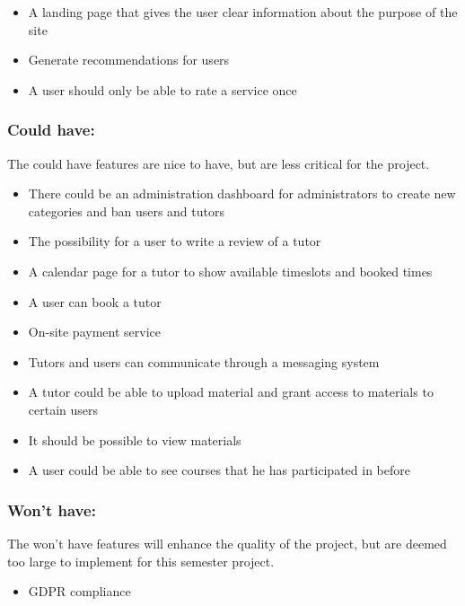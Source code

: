 \begin{itemize}
    \item A landing page that gives the user clear information about the purpose of the site
    \item Generate recommendations for users
    \item A user should only be able to rate a service once
\end{itemize}

\subsubsection{Could have:}
The could have features are nice to have, but are less critical for the project.

\begin{itemize}
    \item There could be an administration dashboard for administrators to create new categories and ban users and tutors
    \item The possibility for a user to write a review of a tutor
    \item A calendar page for a tutor to show available timeslots and booked times
    \item A user can book a tutor
    \item On-site payment service
    \item Tutors and users can communicate through a messaging system
    \item A tutor could be able to upload material and grant access to materials to certain users
    \item It should be possible to view materials
    \item A user could be able to see courses that he has participated in before
\end{itemize}

\subsubsection{Won't have:}
The won't have features will enhance the quality of the project, but are deemed too large to implement for this semester project.
\begin{itemize}
    \item GDPR compliance
\end{itemize}
